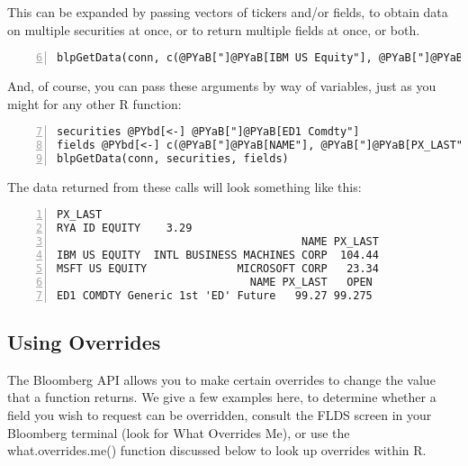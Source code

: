 \documentclass[a4paper]{article}
\begin{document}
    

This can be expanded by passing vectors of tickers and/or fields, to obtain data on multiple securities at once, or to return multiple fields at once, or both.

\begin{Verbatim}[commandchars=@\[\],numbers=left,firstnumber=6,stepnumber=1]
blpGetData(conn, c(@PYaB["]@PYaB[IBM US Equity"], @PYaB["]@PYaB[MSFT US Equity"]), c(@PYaB["]@PYaB[NAME"], @PYaB["]@PYaB[PX_LAST"]))
\end{Verbatim}

    

And, of course, you can pass these arguments by way of variables, just as you might for any other R function:

\begin{Verbatim}[commandchars=@\[\],numbers=left,firstnumber=7,stepnumber=1]
securities @PYbd[<-] @PYaB["]@PYaB[ED1 Comdty"]
fields @PYbd[<-] c(@PYaB["]@PYaB[NAME"], @PYaB["]@PYaB[PX_LAST"], @PYaB["]@PYaB[OPEN"])
blpGetData(conn, securities, fields)
\end{Verbatim}

    

The data returned from these calls will look something like this:

\begin{Verbatim}[commandchars=@\[\],numbers=left,firstnumber=1,stepnumber=1]
              PX_LAST
RYA ID EQUITY    3.29
                                      NAME PX_LAST
IBM US EQUITY  INTL BUSINESS MACHINES CORP  104.44
MSFT US EQUITY              MICROSOFT CORP   23.34
                              NAME PX_LAST   OPEN
ED1 COMDTY Generic 1st 'ED' Future   99.27 99.275
\end{Verbatim}

    


\subsection{Using Overrides} %
\label{sub:using_overrides}

The Bloomberg API allows you to make certain overrides to change the value that a function returns. We give a few examples here, to determine whether a field you wish to request can be overridden, consult the FLDS screen in your Bloomberg terminal (look for What Overrides Me), or use the what.overrides.me() function discussed below to look up overrides within R.
\end{document}
